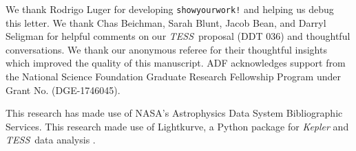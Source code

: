 \documentclass[twocolumn]{aastex631}
\newcommand{\tess}{\textit{TESS}}
\begin{document}
\begin{acknowledgments}
We thank Rodrigo Luger for developing \texttt{showyourwork!} \citep{luger21} and helping us debug this letter. We thank Chas Beichman, Sarah Blunt, Jacob Bean, and Darryl Seligman for helpful comments on our \tess\ proposal (DDT 036) and thoughtful conversations. We thank our anonymous referee for their thoughtful insights which improved the quality of this manuscript. ADF acknowledges support from the National Science Foundation Graduate Research Fellowship Program under Grant No. (DGE-1746045).

This research has made use of NASA's Astrophysics Data System Bibliographic Services. This research made use of Lightkurve, a Python package for \textit{Kepler} and \tess\ data analysis \citep{lightkurve}.

\end{acknowledgments}
\end{document}

